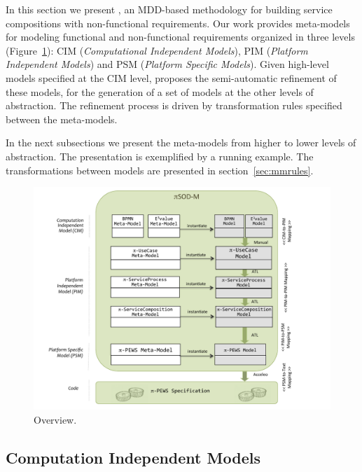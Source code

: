 
In this section we present \pisodm, an MDD-based methodology for building service compositions with non-functional requirements. 
Our work provides meta-models for modeling functional and non-functional requirements organized in three levels (Figure~\ref{fig:piSOD-M}): CIM (\textit{Computational Independent Models}), PIM (\textit{Plat\-form Independent Models}) and PSM (\textit{Platform Specific Models}). 
Given  high-level models specified at the CIM level, \pisodm proposes the semi-automatic refinement of these models, for the generation of a set of models at the other levels of abstraction.
The refinement process is driven by transformation rules specified between the meta-models.

In the next subsections we present the me\-ta-models from higher to lower levels of abstraction.
The presentation is exemplified by a running example.
The transformations between models are presented in section~\ref{sec:mmrules}.

\begin{figure}
\centering
\includegraphics[width=1.0\textwidth]{figs/piSOD-M_process.pdf}
\caption{\pisodm Overview.}
\label{fig:piSOD-M}
\end{figure}



\subsection{Computation Independent Models}

